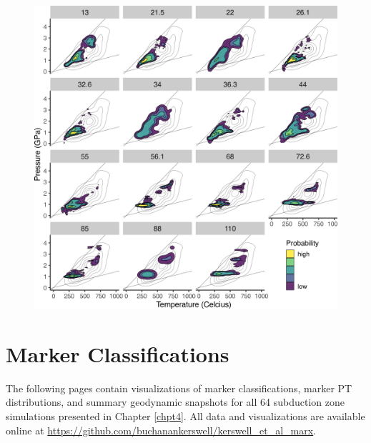 \begin{figure}[htbp]

{\centering \includegraphics[width=1\linewidth,]{assets/figs/chpt4/phiDensity} 

}

\end{figure}

\cleardoublepage

\hypertarget{vis}{%
\section{Marker Classifications}\label{vis}}

The following pages contain visualizations of marker classifications, marker PT distributions, and summary geodynamic snapshots for all 64 subduction zone simulations presented in Chapter \ref{chpt4}. All data and visualizations are available online at \url{https://github.com/buchanankerswell/kerswell_et_al_marx}.


